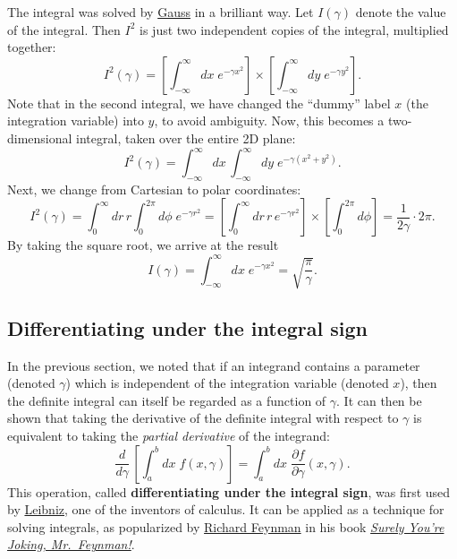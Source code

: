 \documentclass[10pt,a4paper]{article}
\begin{document}
The integral was solved by
\href{http://en.wikipedia.org/wiki/Carl_Friedrich_Gauss}{Gauss} in a
brilliant way. Let $I(\gamma)$ denote the value of the integral. Then
$I^2$ is just two independent copies of the integral, multiplied
together:
\begin{equation}
I^2(\gamma) = \left[\int_{-\infty}^\infty dx\; e^{-\gamma x^2}\right] \times \left[\int_{-\infty}^\infty dy\; e^{-\gamma y^2}\right].
\end{equation}
Note that in the second integral, we have changed the ``dummy'' label
$x$ (the integration variable) into $y$, to avoid ambiguity. Now,
this becomes a two-dimensional integral, taken over the entire 2D plane:
\begin{equation}
I^2(\gamma) = \int_{-\infty}^\infty dx\, \int_{-\infty}^\infty dy \; e^{-\gamma (x^2+y^2)}.
\end{equation}
Next, we change from Cartesian to polar coordinates:
\begin{equation}
I^2(\gamma) = \int_{0}^\infty dr\, r \int_{0}^{2\pi} d\phi \; e^{-\gamma r^2} = \left[ \int_{0}^\infty dr\, r \, e^{-\gamma r^2}\right] \times \left[\int_{0}^{2\pi} d\phi \right] = \frac{1}{2\gamma} \cdot 2\pi.
\end{equation}
By taking the square root, we arrive at the result
\begin{equation}
I(\gamma) = \int_{-\infty}^\infty dx \; e^{-\gamma x^2} = \sqrt{\frac{\pi}{\gamma}}.
\end{equation}
    \hypertarget{differentiating-under-the-integral-sign}{%
\subsection{Differentiating under the integral
sign}\label{differentiating-under-the-integral-sign}}

In the previous section, we noted that if an integrand contains a
parameter (denoted $\gamma$) which is independent of the integration
variable (denoted $x$), then the definite integral can itself be
regarded as a function of $\gamma$. It can then be shown that taking
the derivative of the definite integral with respect to $\gamma$ is
equivalent to taking the \textit{partial derivative} of the integrand:
\begin{equation}
\frac{d}{d\gamma} \, \left[\int_a^b dx\; f(x,\gamma)\right] = \int_a^b dx \; \frac{\partial f}{\partial \gamma}(x,\gamma).
\end{equation}
This operation, called \textbf{differentiating under the integral sign},
was first used by
\href{https://en.wikipedia.org/wiki/Gottfried_Wilhelm_Leibniz}{Leibniz},
one of the inventors of calculus. It can be applied as a technique for
solving integrals, as popularized by
\href{https://en.wikipedia.org/wiki/Richard_Feynman}{Richard Feynman} in
his book
\href{https://en.wikipedia.org/wiki/Surely_You\%27re_Joking,_Mr._Feynman!}{\emph{Surely
You're Joking, Mr.~Feynman!}}.
\end{document}
